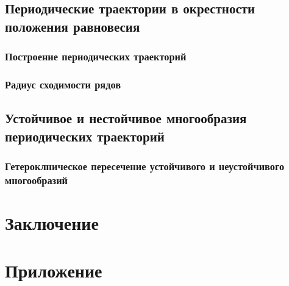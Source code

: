 \documentclass[a4paper, 12pt]{article}
\begin{document}
        \subsection{Периодические траектории в окрестности положения равновесия}
        
            \subsubsection{Построение периодических траекторий}
            

            \subsubsection{Радиус сходимости рядов}
            

        \subsection{Устойчивое и нестойчивое многообразия периодических траекторий}
        
            \subsubsection{Гетероклническое пересечение устойчивого и неустойчивого многообразий}
            


            
            \section{Заключение}
    \section{Приложение}
    


\end{document}
